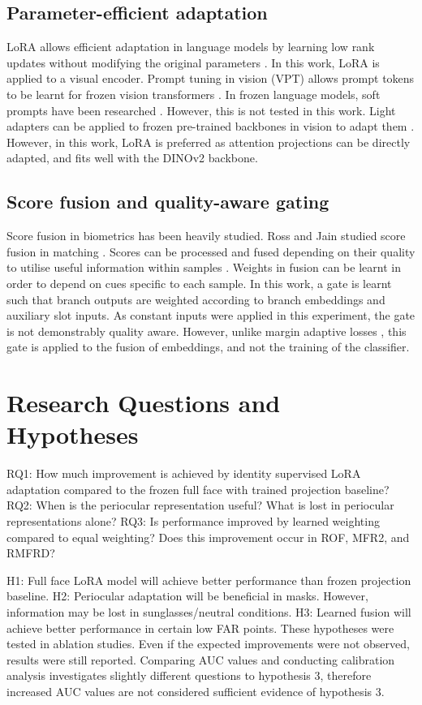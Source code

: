 \documentclass[10pt,lettersize,journal]{IEEEtran}
\begin{document}
\subsection{Parameter-efficient adaptation}
LoRA allows efficient adaptation in language models by learning low rank updates without modifying the original parameters \cite{lora}. In this work, LoRA is applied to a visual encoder. Prompt tuning in vision (VPT) allows prompt tokens to be learnt for frozen vision transformers \cite{vpt}. In frozen language models, soft prompts have been researched \cite{prompt}. However, this is not tested in this work. Light adapters can be applied to frozen pre-trained backbones in vision to adapt them \cite{adaptformer}. However, in this work, LoRA is preferred as attention projections can be directly adapted, and fits well with the DINOv2 backbone.\par
\subsection{Score fusion and quality-aware gating}
Score fusion in biometrics has been heavily studied. Ross and Jain studied score fusion in matching \cite{fusionRossJain}. Scores can be processed and fused depending on their quality to utilise useful information within samples \cite{quality}. Weights in fusion can be learnt in order to depend on cues specific to each sample. In this work, a gate is learnt such that branch outputs are weighted according to branch embeddings and auxiliary slot inputs. As constant inputs were applied in this experiment, the gate is not demonstrably quality aware. However, unlike margin adaptive losses \cite{magface,adaface}, this gate is applied to the fusion of embeddings, and not the training of the classifier.\par
\section{Research Questions and Hypotheses}
RQ1: How much improvement is achieved by identity supervised LoRA adaptation compared to the frozen full face with trained projection baseline? RQ2: When is the periocular representation useful? What is lost in periocular representations alone? RQ3: Is performance improved by learned weighting compared to equal weighting? Does this improvement occur in ROF, MFR2, and RMFRD?\par
H1: Full face LoRA model will achieve better performance than frozen projection baseline. H2: Periocular adaptation will be beneficial in masks. However, information may be lost in sunglasses/neutral conditions. H3: Learned fusion will achieve better performance in certain low FAR points. These hypotheses were tested in ablation studies. Even if the expected improvements were not observed, results were still reported. Comparing AUC values and conducting calibration analysis investigates slightly different questions to hypothesis 3, therefore increased AUC values are not considered sufficient evidence of hypothesis 3.\par
\end{document}
